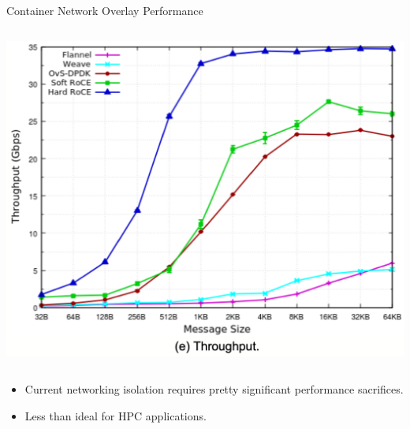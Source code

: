 \documentclass{beamer}
\begin{document}
\begin{frame}{Container Network Overlay Performance}
\begin{columns}
        \includegraphics[width=\textwidth]{overlayperf/throughput.png}
    \end{columns}
    \begin{itemize}
        \item Current networking isolation requires pretty significant performance sacrifices.
        \item Less than ideal for HPC applications.
    \end{itemize}
    {\let\thefootnote\relax{}}
\end{frame}
\end{document}
